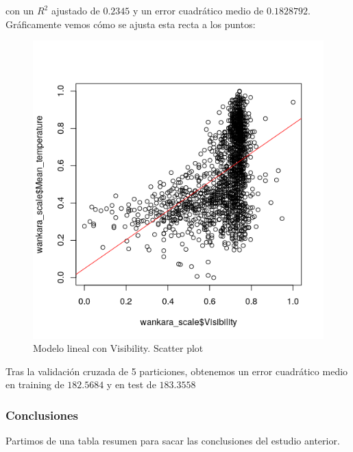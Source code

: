 con un $R^2$ ajustado de $0.2345$  y un error cuadrático medio de $0.1828792$. Gráficamente vemos cómo se ajusta esta recta a los puntos:

\begin{figure}[H] %
	\centering
	\includegraphics[scale=0.55]{plot5.png}  %
	\caption{Modelo lineal con Visibility. Scatter plot} 
	\label{fig:plot5}
\end{figure}

Tras la validación cruzada de 5 particiones, obtenemos un error cuadrático medio en training de $182.5684$ y en test de $183.3558$

\subsubsection{Conclusiones}

Partimos de una tabla resumen para sacar las conclusiones del estudio anterior.


